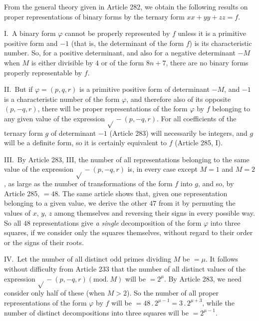 From the general theory given in Article 282, we obtain the following
results on proper representations of binary forms by the ternary form $xx+yy+zz=f$.

I.\ A binary form $\varphi$ cannot be properly represented by $f$
unless it is a primitive positive form and $-1$ (that is, the determinant
of the form $f$) is its characteristic number. So, for a positive
determinant, and also for a negative determinant $-M$ when $M$ is
either divisible by $4$ or of the form $8n+7$, there are no binary
forms properly representable by $f$.

II.\ But if $\varphi=(p,q,r)$ is a primitive positive form of determinant $-M$,
and $-1$ is a characteristic number of the form $\varphi$, and therefore
also of its opposite $(p,-q,r)$, there will be proper representations of
the form $\varphi$ by $f$ belonging to any given value of the expression
$\surd{}-(p,-q,r)$. For all coefficients of the ternary form $g$ of determinant
$-1$ (Article 283) will necessarily be integers, and $g$ will be
a definite form, so it is certainly equivalent to $f$ (Article 285, I).

III.\ By Article 283, III, the number of all representations belonging
to the same value of the expression $\surd{}-(p,-q,r)$ is, in every case except
$M=1$ and $M=2$, as large as the number of transformations of the
form $f$ into $g$, and so, by Article 285, $=48$. The same
article shows that, given one representation belonging to a given value,
we derive the other $47$ from it by permuting the values of $x$,
$y$, $z$
among themselves and reversing their signs in every possible way.
So all $48$ representations give \textit{a single} decomposition of
the form $\varphi$ into three squares, if we consider only the squares
themselves, without regard to their order or the signs of their roots.

IV.\ Let the number of all distinct odd primes dividing $M$ be
$=\mu$. It follows without difficulty from Article 233 that the number
of all distinct values of the expression $\surd{}-(p,\allowbreak -q,\allowbreak r)(\mathrm{mod.}\ M)$ will be $=2^\mu$. By
Article 283, we need consider only half of these (when $M>2$).
So the number of all proper representations of the form $\varphi$ by
$f$ will be $=48\,\allowbreak  .\,\allowbreak  2^{\mu-1}=3\,\allowbreak  .\,\allowbreak  2^{\mu+3}$, while the number of distinct decompositions
into three squares will be $=2^{\mu-1}$.

